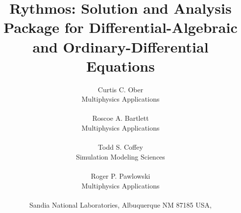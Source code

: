 \documentclass[pdf,11pt]{SANDreport}
\title{ Rythmos: Solution and Analysis Package for Differential-Algebraic and Ordinary-Differential Equations }
\author{
Curtis C. Ober \\ Multiphysics Applications \\ \\
Roscoe A. Bartlett \\ Multiphysics Applications \\ \\
Todd S. Coffey \\ Simulation Modeling Sciences \\ \\
Roger P. Pawlowski \\ Multiphysics Applications \\ \\
Sandia National Laboratories, Albuquerque NM 87185 USA, \\
}
\date{}
\begin{document}
\maketitle

%
\begin{abstract}
  
\end{abstract}

%
\clearpage



%
\cleardoublepage
\tableofcontents


% 


%     


\end{document}
